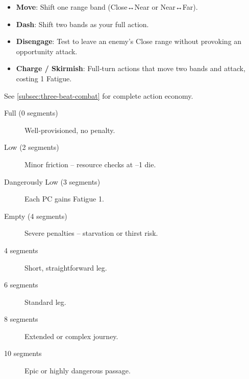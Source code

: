 \begin{tcolorbox}[title=Movement Actions, colback=white!97!gray, colframe=black!80!gray]
\begin{itemize}
  \item \textbf{Move}: Shift one range band (Close↔Near or Near↔Far).
  \item \textbf{Dash}: Shift two bands as your full action.
  \item \textbf{Disengage}: Test to leave an enemy’s Close range without provoking an opportunity attack.
  \item \textbf{Charge / Skirmish}: Full‑turn actions that move two bands and attack, costing 1 Fatigue.
\end{itemize}
See \ref{subsec:three-beat-combat} for complete action economy.
\end{tcolorbox}

\begin{tcolorbox}[title=Supply Clock States, colback=white!97!gray, colframe=black!80!gray]
\begin{description}
\item[Full (0 segments)] Well‑provisioned, no penalty.
\item[Low (2 segments)] Minor friction – resource checks at –1 die.
\item[Dangerously Low (3 segments)] Each PC gains Fatigue 1.
\item[Empty (4 segments)] Severe penalties – starvation or thirst risk.
\end{description}
\end{tcolorbox}

\begin{tcolorbox}[title=Travel Clock Sizes, colback=white!97!gray, colframe=black!80!gray]
\begin{description}
\item[4 segments] Short, straightforward leg.
\item[6 segments] Standard leg.
\item[8 segments] Extended or complex journey.
\item[10 segments] Epic or highly dangerous passage.
\end{description}
\end{tcolorbox}

